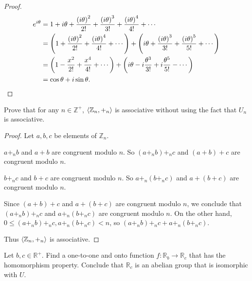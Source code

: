 \begin{proof}
    \begin{align*}
        e^{i\theta} & = 1 + i\theta + \frac{{(i\theta)}^{2}}{2!} + \frac{{(i\theta)}^{3}}{3!} + \frac{{(i\theta)}^{4}}{4!} + \cdots                                                                 \\
                    & = \left(1 + \frac{{(i\theta)}^{2}}{2!} + \frac{{(i\theta)}^{4}}{4!} + \cdots\right) + \left(i\theta + \frac{{(i\theta)}^{3}}{3!} + \frac{{(i\theta)}^{5}}{5!} + \cdots\right) \\
                    & = \left(1 - \frac{x^{2}}{2!} + \frac{x^{4}}{4!} + \cdots \right) + \left(i\theta - i\frac{\theta^{3}}{3!} + i\frac{\theta^{5}}{5!} - \cdots \right)                           \\
                    & = \cos{\theta} + i\sin{\theta}.\qedhere
    \end{align*}
\end{proof}

\newpage
\begin{exercise}
    Prove that for any $n\in\mathbb{Z}^{+}$, $\left\langle{\mathbb{Z}_{n}, {+}_{n}}\right\rangle$ is associative without using the fact that $U_{n}$ is associative.
\end{exercise}

\begin{proof}
    Let $a, b, c$ be elements of $\mathbb{Z}_{n}$.

    $a {+}_{n} b$ and $a + b$ are congruent modulo $n$. So $(a {+}_{n} b) {+}_{n} c$ and $(a + b) + c$ are congruent modulo $n$.

    $b {+}_{n} c$ and $b + c$ are congruent modulo $n$. So $a {+}_{n} (b {+}_{n} c)$ and $a + (b + c)$ are congruent modulo $n$.

    Since $(a + b) + c$ and $a + (b + c)$ are congruent modulo $n$, we conclude that $(a {+}_{n} b) {+}_{n} c$ and $a {+}_{n} (b {+}_{n} c)$ are congruent modulo $n$. On the other hand, $0\le (a {+}_{n} b) {+}_{n} c, a {+}_{n} (b {+}_{n} c) < n$, so $(a {+}_{n} b) {+}_{n} c + a {+}_{n} (b {+}_{n} c)$.

    Thus $\left\langle{\mathbb{Z}_{n}, {+}_{n}}\right\rangle$ is associative.
\end{proof}

\newpage
\begin{exercise}
    Let $b, c\in\mathbb{R}^{+}$. Find a one-to-one and onto function $f: \mathbb{R}_{b} \to \mathbb{R}_{c}$ that has the homomorphism property. Conclude that $\mathbb{R}_{c}$ is an abelian group that is isomorphic with $U$.
\end{exercise}

